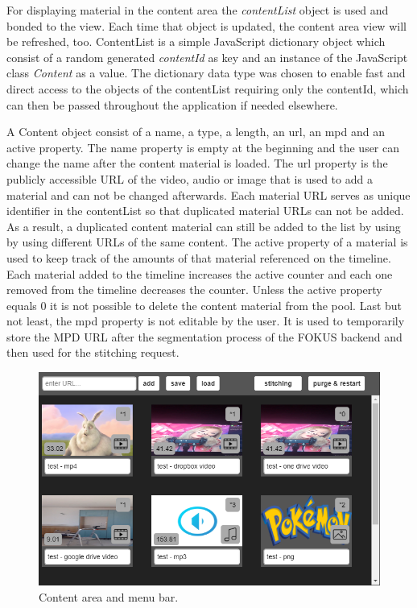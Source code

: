 \documentclass[conference]{IEEEtran}
\begin{document}
For displaying material in the content area the \textit{contentList} object is used and bonded to the view.
Each time that object is updated, the content area view will be refreshed, too.
ContentList is a simple JavaScript dictionary object which consist of a random generated \textit{contentId} as key and an instance of the JavaScript class \textit{Content} as a value.
The dictionary data type was chosen to enable fast and direct access to the objects of the contentList requiring only the contentId, which can then be passed throughout the application if needed elsewhere.

A Content object consist of a name, a type, a length, an url, an mpd and an active property.
The name property is empty at the beginning and the user can change the name after the content material is loaded.
The url property is the publicly accessible URL of the video, audio or image that is used to add a material and can not be changed afterwards.
Each material URL serves as unique identifier in the contentList so that duplicated material URLs can not be added.
As a result, a duplicated content material can still be added to the list by using by using different URLs of the same content.
The active property of a material is used to keep track of the amounts of that material referenced on the timeline.
Each material added to the timeline increases the active counter and each one removed from the timeline decreases the counter.
Unless the active property equals 0 it is not possible to delete the content material from the pool.
Last but not least, the mpd property is not editable by the user. It is used to temporarily store the MPD URL after the segmentation process of the FOKUS backend and then used for the stitching request.
\begin{figure}[H]
\centering
\includegraphics[scale=0.46]{content_area.png}
\caption{Content area and menu bar.}
\end{figure}
\end{document}
